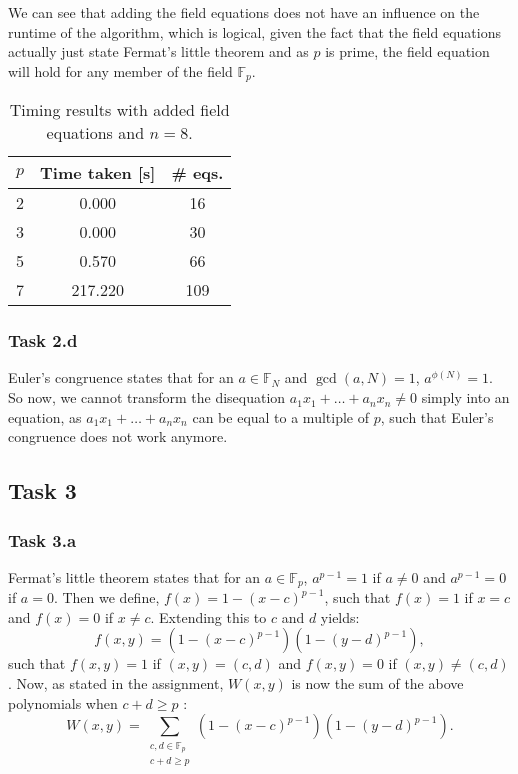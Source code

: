\documentclass{article}
\begin{document}
We can see that adding the field equations does not have an influence on the
runtime of the algorithm, which is logical, given the fact that the field
equations actually just state Fermat's little theorem and as $p$ is prime, the
field equation will hold for any member of the field $\mathbb F_p$.

\begin{table}[htpb]
  \centering
  \caption{Timing results with added field equations and $n = 8$.}
  \label{tab:label}
  \begin{tabular}{ccc}
   \toprule
   $p$ & Time taken [s] & \# eqs. \\
   \midrule
   2 & 0.000 & 16 \\
   \midrule
   3 & 0.000 & 30 \\
   \midrule
   5 & 0.570 & 66 \\
   \midrule
   7 & 217.220 & 109 \\
   \bottomrule
  \end{tabular}
\end{table}

\subsubsection*{Task 2.d}

Euler's congruence states that for an $a \in \mathbb{F}_N$ and $\gcd(a, N) = 1$,
$a^{\phi(N)} = 1$. So now, we cannot transform the disequation $a_1 x_1 + \dots
+ a_n x_n \neq 0$ simply into an equation, as $a_1 x_1 + \dots + a_n x_n$ can be
equal to a multiple of $p$, such that Euler's congruence does not work anymore.

\subsection*{Task 3}
\subsubsection*{Task 3.a}

Fermat's little theorem states that for an $a \in \mathbb{F}_p$, $a^{p-1} = 1$
if $a \neq 0$ and $a^{p - 1} = 0$ if $a = 0$. Then we define, $f(x) = 1 -
\left( x -  c \right)^{p - 1}$, such that $f(x) = 1$ if  $x = c$ and $f(x) = 0$
if $x \neq  c$. Extending this to $c$ and $d$ yields: 
\begin{equation}
  f(x, y) = \left( 1 - (x - c)^{p-1} \right) \left( 1 - (y - d)^{p - 1} \right),
\end{equation} 
such that $f(x, y) = 1$ if $(x, y) = (c, d)$ and $f(x,y) = 0$ if $(x, y) \neq
(c, d)$. Now, as stated in the assignment, $W(x, y)$ is now the sum of the above
polynomials when $c + d \ge  p$ : 
\begin{equation}
  W(x, y) = \sum_{\substack{c, d \in \mathbb{F}_p \\ c + d \ge p}}
\left( 1 - (x - c)^{p-1} \right) \left( 1 - (y - d)^{p - 1} \right).
\end{equation} 
\end{document}
